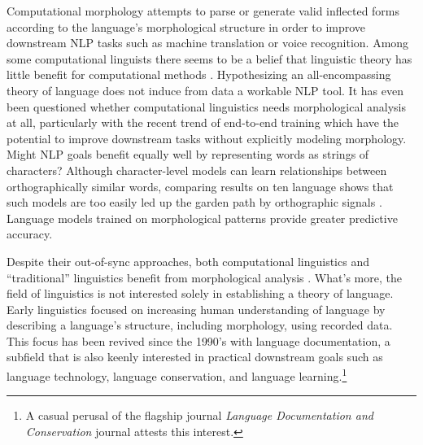 \documentclass[12pt]{article}
\newcommand{\note}[4][]{\todo[author=#2,color=#3,size=\scriptsize,fancyline,caption={},#1]{#4}}
\newcommand{\mans}[2][]{\note[#1]{MH}{blue!40}{#2}{}}
\begin{document}
Computational morphology attempts to parse or generate valid inflected forms according to the language's morphological structure in order to improve downstream NLP tasks such as machine translation or voice recognition. Among some computational linguists there seems to be a belief that linguistic theory has little benefit for computational methods \cite{goldsmith_computational_2017}. Hypothesizing an all-encompassing theory of language does not induce from data a workable NLP tool. It has even been questioned whether computational linguistics needs morphological analysis at all, particularly with the recent trend of end-to-end training which have the potential to improve downstream tasks without explicitly modeling morphology. Might NLP goals benefit equally well by representing words as strings of characters? Although character-level models can learn relationships between orthographically similar words, comparing results on ten language shows that such models are too easily led up the garden path by orthographic signals \cite{vania_characters_2017}. Language models trained on morphological patterns provide greater predictive accuracy.  

Despite their out-of-sync approaches, both computational linguistics\mans{Why?} and ``traditional'' linguistics benefit from morphological analysis \cite[page 165]{cotterell_labeled_2015}. What's more, the field of linguistics is not interested solely in establishing a theory of language. Early linguistics focused on increasing human understanding of language by describing a language's structure, including morphology, using recorded data. This focus has been revived since the 1990's with language documentation, a subfield that is also keenly interested in practical downstream goals such as language technology, language conservation, and language learning.\footnote{A casual perusal of the flagship journal \textit{Language Documentation and Conservation} journal attests this interest.}
\end{document}
